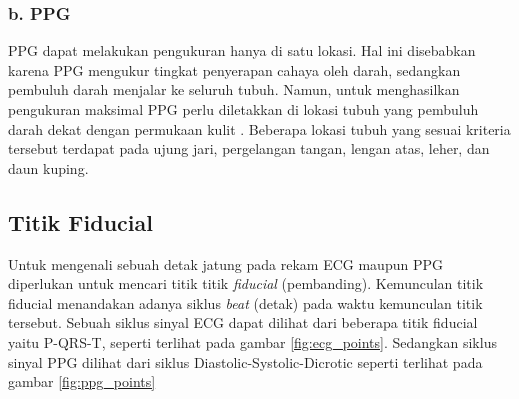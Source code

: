 \subsubsection{b. PPG}
PPG dapat melakukan pengukuran hanya di satu lokasi. Hal ini disebabkan karena PPG mengukur tingkat penyerapan cahaya oleh darah, sedangkan pembuluh darah menjalar ke seluruh tubuh. Namun, untuk menghasilkan pengukuran maksimal PPG perlu diletakkan di lokasi tubuh yang pembuluh darah dekat dengan permukaan kulit \cite{ppg_placement}\cite{ppg_placement2}. Beberapa lokasi tubuh yang sesuai kriteria tersebut terdapat pada ujung jari, pergelangan tangan, lengan atas, leher, dan daun kuping.


\subsection{Titik Fiducial}
Untuk mengenali sebuah detak jatung pada rekam ECG maupun PPG diperlukan untuk mencari titik titik \textit{fiducial} (pembanding). Kemunculan titik fiducial menandakan adanya siklus \textit{beat} (detak) pada waktu kemunculan titik tersebut. Sebuah siklus sinyal ECG dapat dilihat dari beberapa titik fiducial yaitu P-QRS-T, seperti terlihat pada gambar \ref{fig:ecg_points}. Sedangkan siklus sinyal PPG dilihat dari siklus Diastolic-Systolic-Dicrotic seperti terlihat pada gambar \ref{fig:ppg_points}

